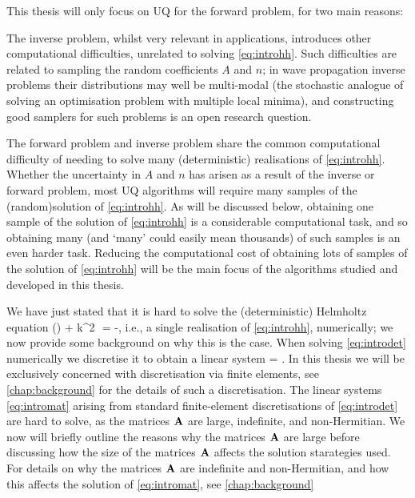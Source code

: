 This thesis will only focus on UQ for the forward problem, for two main reasons:
\ben
\item The inverse problem, whilst very relevant in applications, introduces other computational difficulties, unrelated to solving \eqref{eq:introhh}. Such difficulties are related to sampling the random coefficients $A$ and $n$; in wave propagation inverse problems their distributions may well be multi-modal (the stochastic analogue of solving an optimisation problem with multiple local minima), and constructing good samplers for such problems is an open research question.
\item The forward problem and inverse problem share the common computational difficulty of needing to solve many (deterministic) realisations of \eqref{eq:introhh}. Whether the uncertainty in $A$ and $n$ has arisen as a result of the inverse or forward problem, most UQ algorithms will require many samples of the (random)solution of \eqref{eq:introhh}. As will be discussed below, obtaining one sample of the solution of \eqref{eq:introhh} is a considerable computational task, and so obtaining many (and `many' could easily mean thousands) of such samples is an even harder task. Reducing the computational cost of obtaining lots of samples of the solution of \eqref{eq:introhh} will be the main focus of the algorithms studied and developed in this thesis.
\een

We have just stated that it is hard to solve the (deterministic) Helmholtz equation
\beq\label{eq:introdet}
\grad \cdot (\Ad \grad \ud) + k^2 \,\nd\,\ud = -\fd,
\eeq
i.e., a single realisation of \eqref{eq:introhh}, numerically; we now provide some background on why this is the case. When solving \eqref{eq:introdet} numerically we discretise it to obtain a linear system
\beq\label{eq:intromat}
\Amat \bu = \bff.
\eeq
In this thesis we will be exclusively concerned with discretisation via finite elements, see \cref{chap:background} for the details of such a discretisation. The linear systems \eqref{eq:intromat} arising from standard finite-element discretisations of \eqref{eq:introdet} are hard to solve, as the matrices $\mathbf{A}$ are large, indefinite, and non-Hermitian. We now will briefly outline the reasons why the matrices $\mathbf{A}$ are large before discussing how the size of the matrices $\mathbf{A}$ affects the solution starategies used. For details on why the matrices $\mathbf{A}$ are indefinite and non-Hermitian, and how this affects the solution of \eqref{eq:intromat}, see \cref{chap:background}


